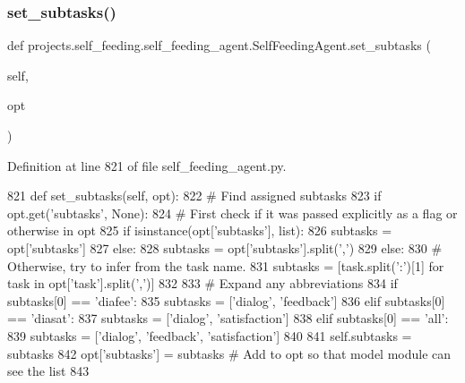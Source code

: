 \subsubsection{\texorpdfstring{set\+\_\+subtasks()}{set\_subtasks()}}
{\footnotesize\ttfamily def projects.\+self\+\_\+feeding.\+self\+\_\+feeding\+\_\+agent.\+Self\+Feeding\+Agent.\+set\+\_\+subtasks (\begin{DoxyParamCaption}\item[{}]{self,  }\item[{}]{opt }\end{DoxyParamCaption})}



Definition at line 821 of file self\+\_\+feeding\+\_\+agent.\+py.


\begin{DoxyCode}
821     \textcolor{keyword}{def }set\_subtasks(self, opt):
822         \textcolor{comment}{# Find assigned subtasks}
823         \textcolor{keywordflow}{if} opt.get(\textcolor{stringliteral}{'subtasks'}, \textcolor{keywordtype}{None}):
824             \textcolor{comment}{# First check if it was passed explicitly as a flag or otherwise in opt}
825             \textcolor{keywordflow}{if} isinstance(opt[\textcolor{stringliteral}{'subtasks'}], list):
826                 subtasks = opt[\textcolor{stringliteral}{'subtasks'}]
827             \textcolor{keywordflow}{else}:
828                 subtasks = opt[\textcolor{stringliteral}{'subtasks'}].split(\textcolor{stringliteral}{','})
829         \textcolor{keywordflow}{else}:
830             \textcolor{comment}{# Otherwise, try to infer from the task name.}
831             subtasks = [task.split(\textcolor{stringliteral}{':'})[1] \textcolor{keywordflow}{for} task \textcolor{keywordflow}{in} opt[\textcolor{stringliteral}{'task'}].split(\textcolor{stringliteral}{','})]
832 
833         \textcolor{comment}{# Expand any abbreviations}
834         \textcolor{keywordflow}{if} subtasks[0] == \textcolor{stringliteral}{'diafee'}:
835             subtasks = [\textcolor{stringliteral}{'dialog'}, \textcolor{stringliteral}{'feedback'}]
836         \textcolor{keywordflow}{elif} subtasks[0] == \textcolor{stringliteral}{'diasat'}:
837             subtasks = [\textcolor{stringliteral}{'dialog'}, \textcolor{stringliteral}{'satisfaction'}]
838         \textcolor{keywordflow}{elif} subtasks[0] == \textcolor{stringliteral}{'all'}:
839             subtasks = [\textcolor{stringliteral}{'dialog'}, \textcolor{stringliteral}{'feedback'}, \textcolor{stringliteral}{'satisfaction'}]
840 
841         self.subtasks = subtasks
842         opt[\textcolor{stringliteral}{'subtasks'}] = subtasks  \textcolor{comment}{# Add to opt so that model module can see the list}
843 
\end{DoxyCode}
